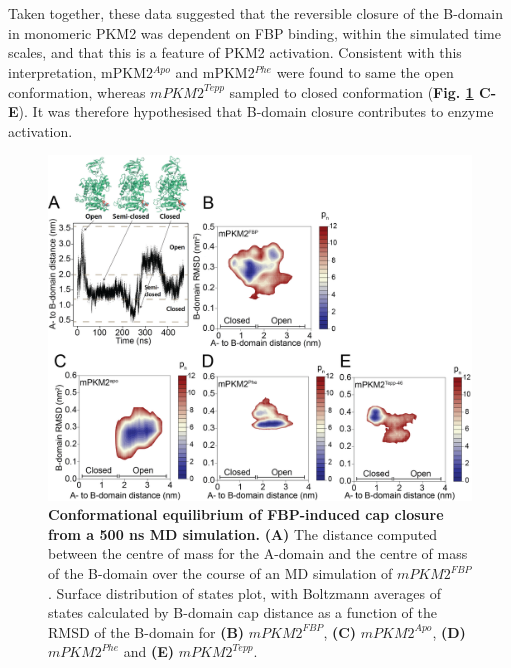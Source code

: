 %
%
\\\\
%
%
Taken together, these data suggested that the reversible closure of the B-domain in monomeric PKM2 was dependent on FBP binding, within the simulated time scales, and that this is a feature of PKM2 activation. Consistent with this interpretation, mPKM2$^{Apo}$ and mPKM2$^{Phe}$ were found to same the open conformation, whereas $mPKM2^{Tepp}$ sampled to closed conformation (\textbf{Fig. \ref{fig:monomer_b-domain} C-E}). It was therefore hypothesised that B-domain closure contributes to enzyme activation.
%
%
%
%
%
\begin{figure}[!ht]
\includegraphics[scale=0.7]{ch6_fig3_bdomain.png}
\caption[Conformational equilibrium of FBP-induced cap closure from a 500 ns MD simulation.] {\textbf{Conformational equilibrium of FBP-induced cap closure from a 500 ns MD simulation.} \textbf{(A)} The distance computed between the centre of mass for the A-domain and the centre of mass of the B-domain over the course of an MD simulation of $mPKM2^{FBP}$. Surface distribution of states plot, with Boltzmann averages of states calculated by B-domain cap distance as a function of the RMSD of the B-domain for \textbf{(B)} $mPKM2^{FBP}$, \textbf{(C)} $mPKM2^{Apo}$, \textbf{(D)} $mPKM2^{Phe}$ and \textbf{(E)} $mPKM2^{Tepp}$.}
\label{fig:monomer_b-domain}
\end{figure}

\clearpage


